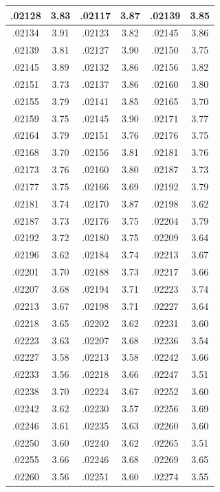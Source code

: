 \documentclass[11pt]{report}
\begin{document}
\begin{appendices}
\begin{longtable}{|c|c||c|c||c|c|}
.02128 & 3.83 & .02117 & 3.87 & .02139 & 3.85\\\hline
.02134 & 3.91 & .02123 & 3.82 & .02145 & 3.86\\\hline
.02139 & 3.81 & .02127 & 3.90 & .02150 & 3.75\\\hline
.02145 & 3.89 & .02132 & 3.86 & .02156 & 3.82\\\hline
.02151 & 3.73 & .02137 & 3.86 & .02160 & 3.80\\\hline
.02155 & 3.79 & .02141 & 3.85 & .02165 & 3.70\\\hline
.02159 & 3.75 & .02145 & 3.90 & .02171 & 3.77\\\hline
.02164 & 3.79 & .02151 & 3.76 & .02176 & 3.75\\\hline
.02168 & 3.70 & .02156 & 3.81 & .02181 & 3.76\\\hline
.02173 & 3.76 & .02160 & 3.80 & .02187 & 3.73\\\hline
.02177 & 3.75 & .02166 & 3.69 & .02192 & 3.79\\\hline
.02181 & 3.74 & .02170 & 3.87 & .02198 & 3.62\\\hline
.02187 & 3.73 & .02176 & 3.75 & .02204 & 3.79\\\hline
.02192 & 3.72 & .02180 & 3.75 & .02209 & 3.64\\\hline
.02196 & 3.62 & .02184 & 3.74 & .02213 & 3.67\\\hline
.02201 & 3.70 & .02188 & 3.73 & .02217 & 3.66\\\hline
.02207 & 3.68 & .02194 & 3.71 & .02223 & 3.74\\\hline
.02213 & 3.67 & .02198 & 3.71 & .02227 & 3.64\\\hline
.02218 & 3.65 & .02202 & 3.62 & .02231 & 3.60\\\hline
.02223 & 3.63 & .02207 & 3.68 & .02236 & 3.54\\\hline
.02227 & 3.58 & .02213 & 3.58 & .02242 & 3.66\\\hline
.02233 & 3.56 & .02218 & 3.66 & .02247 & 3.51\\\hline
.02238 & 3.70 & .02224 & 3.67 & .02252 & 3.60\\\hline
.02242 & 3.62 & .02230 & 3.57 & .02256 & 3.69\\\hline
.02246 & 3.61 & .02235 & 3.63 & .02260 & 3.60\\\hline
.02250 & 3.60 & .02240 & 3.62 & .02265 & 3.51\\\hline
.02255 & 3.66 & .02246 & 3.68 & .02269 & 3.65\\\hline
.02260 & 3.56 & .02251 & 3.60 & .02274 & 3.55\\\hline

\end{longtable}
\end{appendices}
\end{document}
